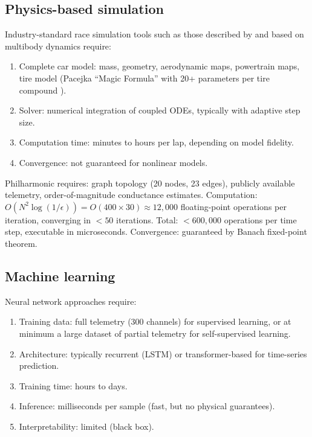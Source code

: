 \documentclass[twocolumn,10pt,a4paper]{article}
\theoremstyle{definition}
\theoremstyle{remark}
\begin{document}
\subsection{Physics-based simulation}

Industry-standard race simulation tools such as those described by \citet{Heilmeier2020} and based on multibody dynamics \citep{Gillespie1992, Milliken1995} require:
\begin{enumerate}
    \item Complete car model: mass, geometry, aerodynamic maps, powertrain maps, tire model (Pacejka ``Magic Formula'' with 20+ parameters per tire compound \citep{Pacejka2012}).
    \item Solver: numerical integration of coupled ODEs, typically with adaptive step size.
    \item Computation time: minutes to hours per lap, depending on model fidelity.
    \item Convergence: not guaranteed for nonlinear models.
\end{enumerate}

Philharmonic requires: graph topology (20 nodes, 23 edges), publicly available telemetry, order-of-magnitude conductance estimates. Computation: $O(N^2 \log(1/\epsilon)) = O(400 \times 30) \approx 12{,}000$ floating-point operations per iteration, converging in $< 50$ iterations. Total: $< 600{,}000$ operations per time step, executable in microseconds. Convergence: guaranteed by Banach fixed-point theorem.

\subsection{Machine learning}

Neural network approaches require:
\begin{enumerate}
    \item Training data: full telemetry (300 channels) for supervised learning, or at minimum a large dataset of partial telemetry for self-supervised learning.
    \item Architecture: typically recurrent (LSTM) or transformer-based for time-series prediction.
    \item Training time: hours to days.
    \item Inference: milliseconds per sample (fast, but no physical guarantees).
    \item Interpretability: limited (black box).
\end{enumerate}
\end{document}
